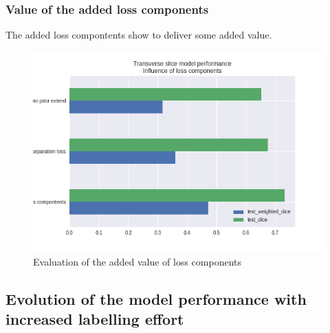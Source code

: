 \subsubsection{Value of the added loss components}

The added loss compontents show to deliver some added value.

\begin{figure}
    \centering
    \includegraphics[width=.95\textwidth]{images/TransverseModel_Losscomponents.png}
    \caption{Evaluation of the added value of loss components}
\end{figure}

\subsection{Evolution of the model performance with increased labelling effort}